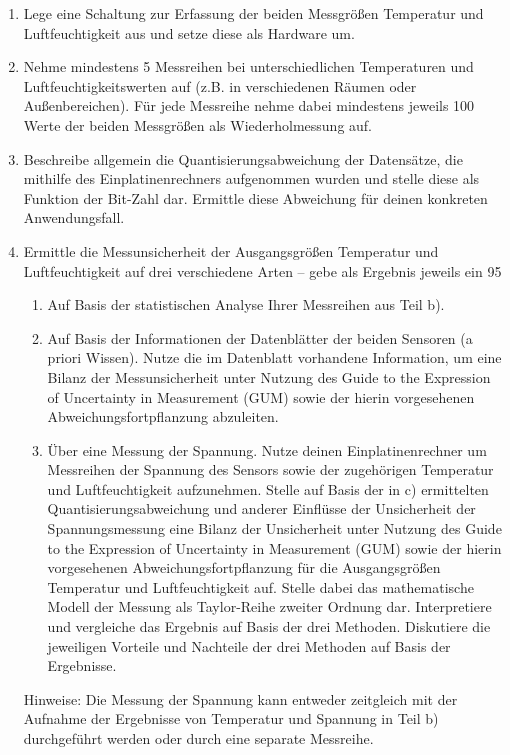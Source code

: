 \documentclass{article}
\begin{document}
\begin{enumerate}
	\item Lege eine Schaltung zur Erfassung der beiden Messgrößen Temperatur und Luftfeuchtigkeit aus und setze diese als Hardware um.
	\item Nehme mindestens 5 Messreihen bei unterschiedlichen Temperaturen und Luftfeuchtigkeitswerten auf (z.B. in verschiedenen Räumen oder Außenbereichen). Für jede Messreihe nehme dabei mindestens jeweils 100 Werte der beiden Messgrößen als Wiederholmessung auf.
	\item Beschreibe allgemein die Quantisierungsabweichung der Datensätze, die mithilfe des Einplatinenrechners aufgenommen wurden und stelle diese als Funktion der Bit-Zahl dar. Ermittle diese Abweichung für deinen konkreten Anwendungsfall.
	\item Ermittle die Messunsicherheit der Ausgangsgrößen Temperatur und Luftfeuchtigkeit auf drei verschiedene Arten – gebe als Ergebnis jeweils ein 95%
\begin{enumerate}
	\item Auf Basis der statistischen Analyse Ihrer Messreihen aus Teil b).
\item Auf Basis der Informationen der Datenblätter der beiden Sensoren (a priori Wissen). Nutze die im Datenblatt vorhandene Information, um eine Bilanz der Messunsicherheit unter Nutzung des Guide to the Expression of Uncertainty in Measurement (GUM) sowie der hierin vorgesehenen Abweichungsfortpflanzung abzuleiten.
\item Über eine Messung der Spannung. Nutze deinen Einplatinenrechner um Messreihen der Spannung des Sensors sowie der zugehörigen Temperatur und Luftfeuchtigkeit aufzunehmen. Stelle auf Basis der in c) ermittelten Quantisierungsabweichung und anderer Einflüsse der Unsicherheit der Spannungsmessung eine Bilanz der Unsicherheit unter Nutzung des Guide to the Expression of Uncertainty in Measurement (GUM) sowie der hierin vorgesehenen Abweichungsfortpflanzung für die Ausgangsgrößen Temperatur und Luftfeuchtigkeit auf. Stelle dabei das mathematische Modell der Messung als Taylor-Reihe zweiter Ordnung dar. Interpretiere und vergleiche das Ergebnis auf Basis der drei Methoden. Diskutiere die jeweiligen Vorteile und Nachteile der drei Methoden auf Basis der Ergebnisse.
\end{enumerate}
Hinweise: Die Messung der Spannung kann entweder zeitgleich mit der Aufnahme der Ergebnisse von Temperatur und Spannung in Teil b) durchgeführt werden oder durch eine separate Messreihe.

\end{enumerate}
\end{document}
